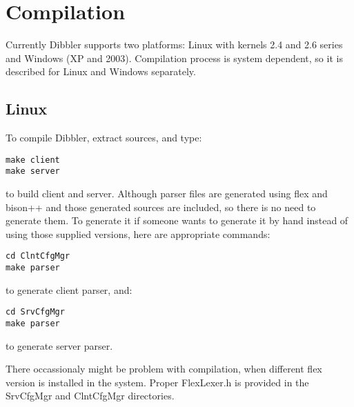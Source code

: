 
\section{Compilation}
Currently Dibbler supports two platforms: Linux with kernels 2.4 and
2.6 series and Windows (XP and 2003). Compilation process is system
dependent, so it is described for Linux and Windows separately.

\subsection{Linux}
To compile Dibbler, extract sources, and type:
\begin{verbatim}
make client
make server
\end{verbatim}
to build client and server. Although parser files are generated using
flex and bison++ and those generated sources are included, so there is
no need to generate them. To generate it if someone wants to generate it by hand
instead of using those supplied versions, here are appropriate commands:
\begin{verbatim}
cd ClntCfgMgr
make parser
\end{verbatim}
to generate client parser, and:
\begin{verbatim}
cd SrvCfgMgr
make parser
\end{verbatim}
to generate server parser.

There occassionaly might be problem with compilation, when different
flex version is installed in the system. Proper FlexLexer.h is
provided in the SrvCfgMgr and ClntCfgMgr directories.

